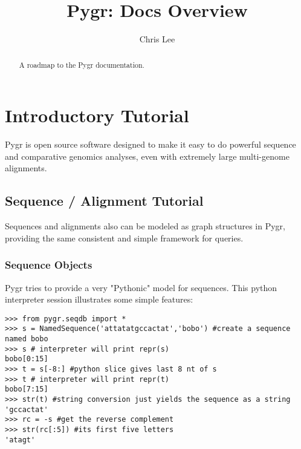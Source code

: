 \documentclass{howto}
\title{Pygr: Docs Overview}
\author{Chris Lee}
\begin{document}
\maketitle

\begin{abstract}
  \noindent
   A roadmap to the Pygr documentation.
\end{abstract}



%
\tableofcontents


\section{Introductory Tutorial}
\label{intro}

Pygr is open source software designed to make it easy to do powerful sequence and
comparative genomics analyses, even with extremely large multi-genome alignments.


\subsection{Sequence / Alignment Tutorial}
\label{seq-align}

Sequences and alignments also can be modeled as graph structures in Pygr, providing the same consistent and simple framework for queries.

\subsubsection{Sequence Objects}
Pygr tries to provide a very "Pythonic" model for sequences.  This python interpreter session illustrates some simple features:

\begin{verbatim}
>>> from pygr.seqdb import *
>>> s = NamedSequence('attatatgccactat','bobo') #create a sequence named bobo
>>> s # interpreter will print repr(s)
bobo[0:15]
>>> t = s[-8:] #python slice gives last 8 nt of s
>>> t # interpreter will print repr(t)
bobo[7:15]
>>> str(t) #string conversion just yields the sequence as a string 
'gccactat'
>>> rc = -s #get the reverse complement
>>> str(rc[:5]) #its first five letters
'atagt'
\end{verbatim}
\end{document}
